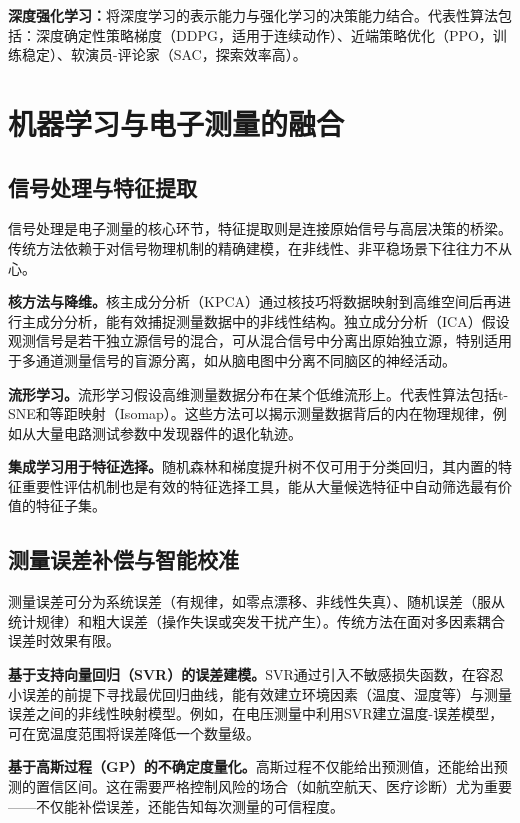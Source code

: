\documentclass[12pt,a4paper]{article}
\numberwithin{figure}{section}
\numberwithin{table}{section}
\numberwithin{equation}{section}
\begin{document}
\textbf{深度强化学习：}将深度学习的表示能力与强化学习的决策能力结合。代表性算法包括：深度确定性策略梯度（DDPG，适用于连续动作）、近端策略优化（PPO，训练稳定）、软演员-评论家（SAC，探索效率高）。

\newpage

\section{机器学习与电子测量的融合}

\subsection{信号处理与特征提取}

信号处理是电子测量的核心环节，特征提取则是连接原始信号与高层决策的桥梁。传统方法依赖于对信号物理机制的精确建模，在非线性、非平稳场景下往往力不从心。

\textbf{核方法与降维。}核主成分分析（KPCA）通过核技巧将数据映射到高维空间后再进行主成分分析，能有效捕捉测量数据中的非线性结构。独立成分分析（ICA）假设观测信号是若干独立源信号的混合，可从混合信号中分离出原始独立源，特别适用于多通道测量信号的盲源分离，如从脑电图中分离不同脑区的神经活动。

\textbf{流形学习。}流形学习假设高维测量数据分布在某个低维流形上。代表性算法包括t-SNE和等距映射（Isomap）。这些方法可以揭示测量数据背后的内在物理规律，例如从大量电路测试参数中发现器件的退化轨迹。

\textbf{集成学习用于特征选择。}随机森林和梯度提升树不仅可用于分类回归，其内置的特征重要性评估机制也是有效的特征选择工具，能从大量候选特征中自动筛选最有价值的特征子集。

\subsection{测量误差补偿与智能校准}

测量误差可分为系统误差（有规律，如零点漂移、非线性失真）、随机误差（服从统计规律）和粗大误差（操作失误或突发干扰产生）。传统方法在面对多因素耦合误差时效果有限。

\textbf{基于支持向量回归（SVR）的误差建模。}SVR通过引入不敏感损失函数，在容忍小误差的前提下寻找最优回归曲线，能有效建立环境因素（温度、湿度等）与测量误差之间的非线性映射模型。例如，在电压测量中利用SVR建立温度-误差模型，可在宽温度范围将误差降低一个数量级。

\textbf{基于高斯过程（GP）的不确定度量化。}高斯过程不仅能给出预测值，还能给出预测的置信区间。这在需要严格控制风险的场合（如航空航天、医疗诊断）尤为重要——不仅能补偿误差，还能告知每次测量的可信程度。
\end{document}
